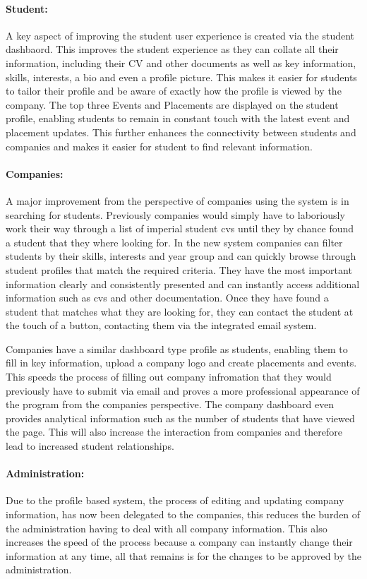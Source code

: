  \paragraph{Student:} 
 	A key aspect of improving the student user experience is created via the student dashbaord. This improves the student experience as they can collate all their information, including their CV and other documents as well as key information, skills, interests, a bio and even a profile picture. This makes it easier for students to tailor their profile and be aware of exactly how the profile is viewed by the company. The top three Events and Placements are displayed on the student profile, enabling students to remain in constant touch with the latest event and placement updates. This further enhances the connectivity between students and companies and makes it easier for student to find relevant information.

\paragraph{Companies:}
  A major improvement from the perspective of companies using the system is in searching for students. Previously companies would simply have to laboriously work their way through a list of imperial student cvs until they by chance found a student that they where looking for. In the new system companies can filter students by their skills, interests and year group and can quickly browse through student profiles that match the required criteria. They have the most important information clearly and consistently presented and can instantly access additional information such as cvs and other documentation. Once they have found a student that matches what they are looking for, they can contact the student at the touch of a button, contacting them via the integrated email system.

  Companies have a similar dashboard type profile as students, enabling them to fill in key information, upload a company logo and create placements and events. This speeds the process of filling out company infromation that they would previously have to submit via email and proves a more professional appearance of the program from the companies perspective. The company dashboard even provides analytical information such as the number of students that have viewed the page. This will also increase the interaction from companies and therefore lead to increased student relationships. 

\paragraph{Administration:}
  Due to the profile based system, the process of editing and updating company information, has now been delegated to the companies, this reduces the burden of the administration having to deal with all company information. This also increases the speed of the process because a company can instantly change their information at any time, all that remains is for the changes to be approved by the administration.

